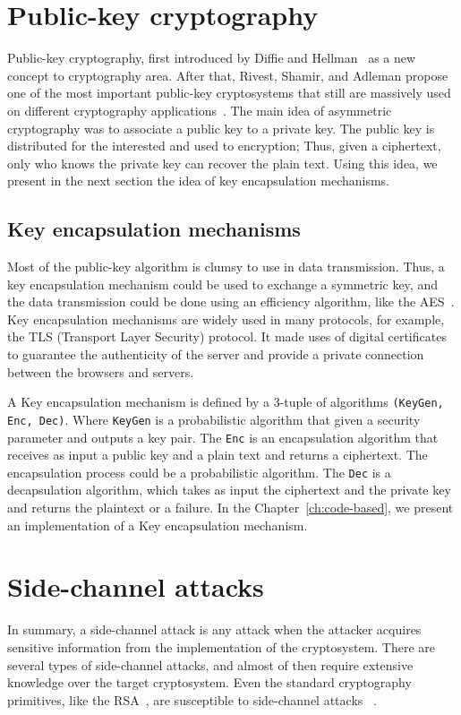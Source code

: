 \section{Public-key cryptography}
Public-key cryptography, first introduced by Diffie and Hellman~\cite{diffie1976new} as a new concept to cryptography area. After that, Rivest, Shamir, and Adleman propose one of the most important public-key cryptosystems that still are massively used on different cryptography applications~\cite{rivest1978method}. The main idea of asymmetric cryptography was to associate a public key to a private key. The public key is distributed for the interested and used to encryption; Thus, given a ciphertext, only who knows the private key can recover the plain text. Using this idea, we present in the next section the idea of key encapsulation mechanisms.

\subsection{Key encapsulation mechanisms}
Most of the public-key algorithm is clumsy to use in data transmission. Thus, a key encapsulation mechanism could be used to exchange a symmetric key, and the data transmission could be done using an efficiency algorithm, like the AES~\cite{daemen2013design}. Key encapsulation mechanisms are widely used in many protocols, for example, the TLS (Transport Layer Security) protocol. It made uses of digital certificates to guarantee the authenticity of the server and provide a private connection between the browsers and servers.

A Key encapsulation mechanism is defined by a 3-tuple of algorithms \texttt{(KeyGen, Enc, Dec)}. Where \texttt{KeyGen} is a probabilistic algorithm that given a security parameter and outputs a key pair. The \texttt{Enc} is an encapsulation algorithm that receives as input a public key and a plain text and returns a ciphertext. The encapsulation process could be a probabilistic algorithm. The \texttt{Dec} is a decapsulation algorithm, which takes as input the ciphertext and the private key and returns the plaintext or a failure. In the Chapter~\ref{ch:code-based}, we present an implementation of a Key encapsulation mechanism.

\section{Side-channel attacks}
In summary, a side-channel attack is any attack when the attacker acquires sensitive information from the implementation of the cryptosystem. There are several types of side-channel attacks, and almost of then require extensive knowledge over the target cryptosystem. Even the standard cryptography primitives, like the RSA~\cite{rivest1978method}, are susceptible to side-channel attacks ~\cite{kocher1996timing}. 

